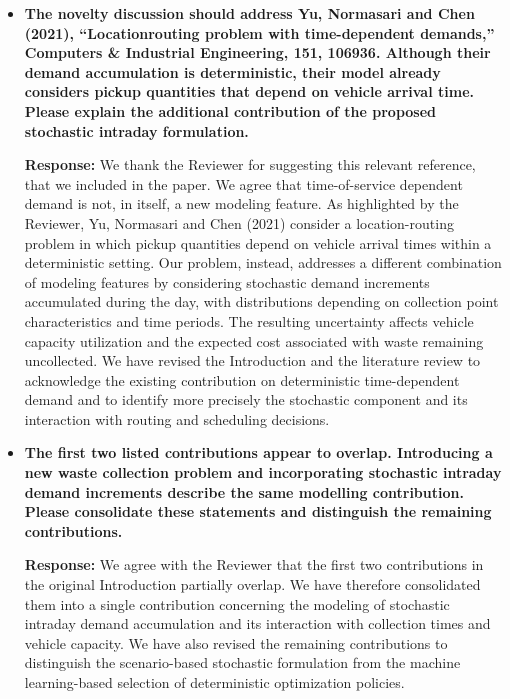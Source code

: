 \documentclass[11pt]{article}
\begin{document}
\begin{enumerate}
\begin{itemize}
\item \textbf{The novelty discussion should address Yu, Normasari and Chen (2021), “Locationrouting
problem with time-dependent demands,” Computers \& Industrial Engineering, 151, 106936. Although their demand accumulation is deterministic, their model already considers pickup quantities that depend on vehicle arrival time. Please explain the
additional contribution of the proposed stochastic intraday formulation.}



\noindent\textbf{Response:} We thank the Reviewer for suggesting this relevant reference, that we included in the paper. We agree that time-of-service dependent demand is not, in itself, a new modeling feature. As highlighted by the Reviewer, Yu, Normasari and Chen (2021) consider a location-routing problem in which pickup quantities depend on vehicle arrival times within a deterministic setting. Our problem, instead, addresses a different combination of modeling features by considering stochastic demand increments accumulated during the day, with distributions depending on collection point characteristics and time periods. The resulting uncertainty affects vehicle capacity utilization and the expected cost associated with waste remaining uncollected. We have revised the Introduction and the literature review to acknowledge the existing contribution on deterministic time-dependent demand and to identify more precisely the stochastic component and its interaction with routing and scheduling decisions.



\item \textbf{The first two listed contributions appear to overlap. Introducing a new waste collection
problem and incorporating stochastic intraday demand increments describe the same
modelling contribution. Please consolidate these statements and distinguish the remaining
contributions.}


\noindent\textbf{Response:} We agree with the Reviewer that the first two contributions in the original Introduction partially overlap. We have therefore consolidated them into a single contribution concerning the modeling of stochastic intraday demand accumulation and its interaction with collection times and vehicle capacity. We have also revised the remaining contributions to distinguish the scenario-based stochastic formulation from the machine learning-based selection of deterministic optimization policies.




\end{itemize}
\end{enumerate}
\end{document}
